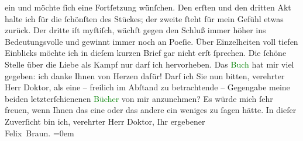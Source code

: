                    ein und möchte ſich eine Fortſetzung wün{\pb}ſchen. Den erſten und den
                    dritten Akt halte ich für die ſchönſten des Stückes; der zweite ſteht für mein
                    Gefühl etwas zurück. Der dritte iſt myſtiſch, wächſt gegen den Schluß immer
                    höher ins Bedeutungsvolle und gewinnt immer noch an Poeſie. Über Einzelheiten
                    voll tiefen Einblicks möchte ich in dieſem kurzen Brief gar nicht erſt ſprechen.
                    Die ſchöne Stelle über die Liebe als Kampf nur darf ich hervorheben. Das \textcolor{green}{Buch}{} hat mir viel gegeben:
                    ich danke Ihnen von Herzen dafür!\pend
           \pstart
           Darf ich Sie nun bitten, verehrter Herr Doktor, als eine – freilich im Abſtand zu
                    betrachtende – Gegengabe meine beiden letzterſchienenen \textcolor{green}{Bücher}{} von mir anzunehmen? Es
                    würde mich ſehr freuen, wenn Ihnen das eine oder das andere ein weniges zu ſagen
                    hätte.\pend
           \pstart
           In dieſer Zuverſicht bin ich, verehrter Herr Doktor, Ihr ergebener{\\[\baselineskip]}\spacefill\mbox{Felix Braun.}\pend
           \leftskip=0em{}\endnumbering{}  
      